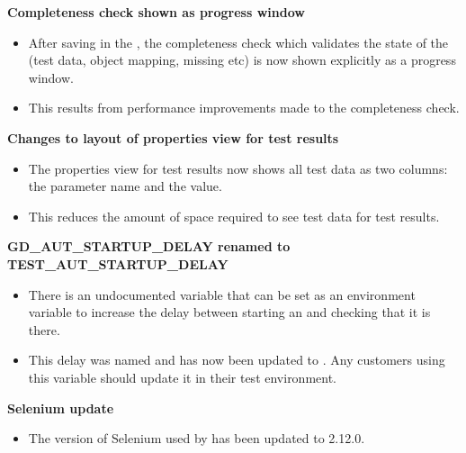 \textbf{Completeness check shown as progress window}\\
\begin{itemize}
\item After saving in the \ite{}, the completeness check which validates the state of the \gdproject{} (test data, object mapping, missing \gdcases{} etc) is now shown explicitly as a progress window.
\item This results from performance improvements made to the completeness check.
\end{itemize} 

\textbf{Changes to layout of properties view for test results}\\
\begin{itemize}
\item The properties view for test results now shows all test data as two columns: the parameter name and the value.
\item This reduces the amount of space required to see test data for test results. 
\end{itemize} 


\textbf{GD\_AUT\_STARTUP\_DELAY renamed to TEST\_AUT\_STARTUP\_DELAY}\\
\begin{itemize}
\item There is an undocumented variable that can be set as an environment variable to increase the delay between starting an \gdaut{} and checking that it is there.
\item This delay was named  and has now been updated to . Any customers using this variable should update it in their test environment. 
\end{itemize}

\textbf{Selenium update}
\begin{itemize}
\item The version of Selenium used by \app{} has been updated to 2.12.0.
\end{itemize}
